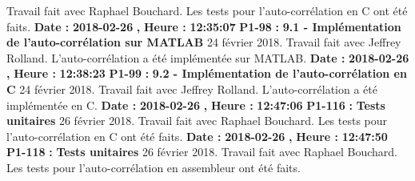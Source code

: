 \documentclass{article}%
\begin{document}
Travail fait avec Raphael Bouchard.\newline%
Les tests pour l'auto{-}corrélation en C ont été faits.\newline%
\newline%
%
\textbf{Date : }%
\textbf{2018{-}02{-}26}%
\textbf{,}%
\textbf{ Heure : }%
\textbf{12:35:07}%
\newline%
%
\textbf{P1{-}98 }%
\textbf{ : }%
\textbf{ 9.1 {-} Implémentation de l'auto{-}corrélation sur MATLAB}%
\newline%
\newline%
%
24 février 2018.\newline%
Travail fait avec Jeffrey Rolland.\newline%
L'auto{-}corrélation a été implémentée sur MATLAB.\newline%
\newline%
%
\textbf{Date : }%
\textbf{2018{-}02{-}26}%
\textbf{,}%
\textbf{ Heure : }%
\textbf{12:38:23}%
\newline%
%
\textbf{P1{-}99 }%
\textbf{ : }%
\textbf{ 9.2 {-} Implémentation de l'auto{-}corrélation en C}%
\newline%
\newline%
%
24 février 2018.\newline%
Travail fait avec Jeffrey Rolland.\newline%
L'auto{-}corrélation a été implémentée en C.\newline%
\newline%
%
\textbf{Date : }%
\textbf{2018{-}02{-}26}%
\textbf{,}%
\textbf{ Heure : }%
\textbf{12:47:06}%
\newline%
%
\textbf{P1{-}116 }%
\textbf{ : }%
\textbf{ Tests unitaires}%
\newline%
\newline%
%
26 février 2018.\newline%
Travail fait avec Raphael Bouchard.\newline%
Les tests pour l'auto{-}corrélation en C ont été faits.\newline%
\newline%
%
\textbf{Date : }%
\textbf{2018{-}02{-}26}%
\textbf{,}%
\textbf{ Heure : }%
\textbf{12:47:50}%
\newline%
%
\textbf{P1{-}118 }%
\textbf{ : }%
\textbf{ Tests unitaires}%
\newline%
\newline%
%
26 février 2018.\newline%
Travail fait avec Raphael Bouchard.\newline%
Les tests pour l'auto{-}corrélation en assembleur ont été faits.\newline%
\newline%
%
\newpage
\end{document}
